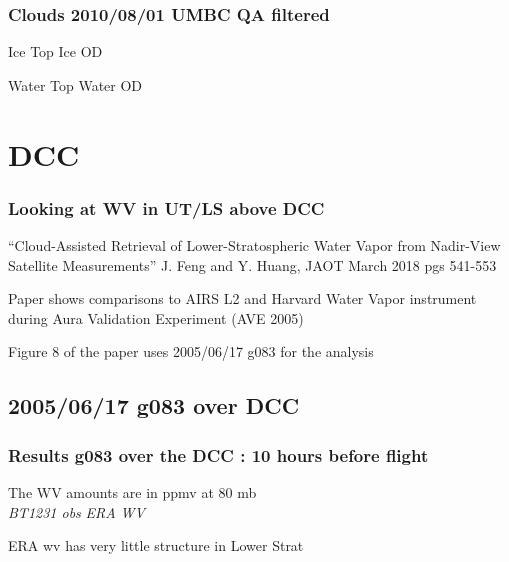 \documentclass[10pt,t]{beamer}
\begin{document}
\begin{frame}
  \frametitle{Clouds 2010/08/01 UMBC QA filtered}

  Ice Top  \hspace{2.0in} Ice OD\\
  \begin{center}
  \end{center}

  Water Top \hspace{2.0in} Water OD\\
  \begin{center}
  \end{center}

\end{frame}
\section{DCC}
\begin{frame}
  \frametitle{Looking at WV in UT/LS above DCC}
  ``Cloud-Assisted Retrieval of Lower-Stratospheric Water Vapor from Nadir-View Satellite
    Measurements''  J. Feng and Y. Huang, JAOT March 2018 pgs 541-553

Paper shows comparisons to  AIRS L2 and Harvard Water Vapor instrument during Aura
       Validation Experiment (AVE 2005)

Figure 8 of the paper uses 2005/06/17 g083 for the analysis

\end{frame}

\subsection{2005/06/17 g083 over DCC}
\begin{frame}
\frametitle{Results g083 over the DCC : 10 hours before flight}
The WV amounts are in ppmv at 80 mb\\
\hspace{0.5in} \emph{BT1231 obs}  \hspace{2.0in} \emph{ERA WV} \\
\begin{center}
\end{center}
ERA wv has very little structure in Lower Strat
\end{frame}
\end{document}

